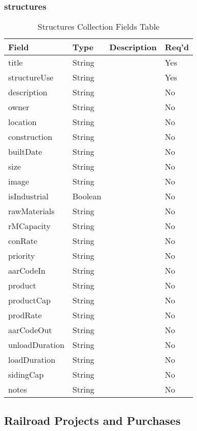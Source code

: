 \subsubsection{structures}
\begin{table}[H]
    \begin{tabular}{|L{3cm}|L{1.7cm}|L{8.8cm}|L{1.3cm}|}
    \hline
        \textbf{Field} & \textbf{Type} & \textbf{Description} & \textbf{Req'd} \\ \hline
	title & String &  & Yes \\ \hline
	structureUse & String &  & Yes \\ \hline
	description & String &  & No \\ \hline
	owner & String &  & No \\ \hline
	location & String &  & No \\ \hline
	construction & String &  & No \\ \hline
	builtDate & String &  & No \\ \hline
	size & String &  & No \\ \hline
	image & String &  & No \\ \hline
	isIndustrial & Boolean &  & No \\ \hline
	rawMaterials & String &  & No \\ \hline
	rMCapacity & String &  & No \\ \hline
	conRate & String &  & No \\ \hline
	priority & String &  & No \\ \hline
	aarCodeIn & String &  & No \\ \hline
	product & String &  & No \\ \hline
	productCap & String &  & No \\ \hline
	prodRate & String &  & No \\ \hline
	aarCodeOut & String &  & No \\ \hline
	unloadDuration & String &  & No \\ \hline
	loadDuration & String &  & No \\ \hline
	sidingCap & String &  & No \\ \hline
	notes & String &  & No \\ \hline
    \end{tabular}
    \caption{\label{structure-table}Structures Collection Fields Table}
    \end{table}
\subsection{Railroad Projects and Purchases}
